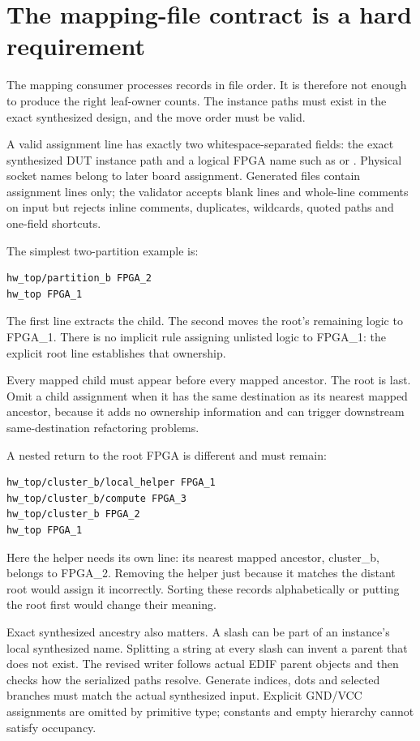 \documentclass[11pt]{article}
\newcommand{\code}[1]{\texttt{\detokenize{#1}}}
\begin{document}
\section{The mapping-file contract is a hard requirement}

The mapping consumer processes records in file order. It is therefore not enough to produce the right leaf-owner counts. The instance paths must exist in the exact synthesized design, and the move order must be valid.

A valid assignment line has exactly two whitespace-separated fields: the exact synthesized DUT instance path and a logical FPGA name such as \code{FPGA_1} or \code{FPGA_A}. Physical socket names belong to later board assignment. Generated files contain assignment lines only; the validator accepts blank lines and whole-line comments on input but rejects inline comments, duplicates, wildcards, quoted paths and one-field shortcuts.

The simplest two-partition example is:
\begin{Verbatim}[fontsize=\small]
hw_top/partition_b FPGA_2
hw_top FPGA_1
\end{Verbatim}
The first line extracts the child. The second moves the root's remaining logic to FPGA\_1. There is no implicit rule assigning unlisted logic to FPGA\_1: the explicit root line establishes that ownership.

Every mapped child must appear before every mapped ancestor. The root is last. Omit a child assignment when it has the same destination as its nearest mapped ancestor, because it adds no ownership information and can trigger downstream same-destination refactoring problems.

A nested return to the root FPGA is different and must remain:
\begin{Verbatim}[fontsize=\small]
hw_top/cluster_b/local_helper FPGA_1
hw_top/cluster_b/compute FPGA_3
hw_top/cluster_b FPGA_2
hw_top FPGA_1
\end{Verbatim}
Here the helper needs its own line: its nearest mapped ancestor, cluster\_b, belongs to FPGA\_2. Removing the helper just because it matches the distant root would assign it incorrectly. Sorting these records alphabetically or putting the root first would change their meaning.

Exact synthesized ancestry also matters. A slash can be part of an instance's local synthesized name. Splitting a string at every slash can invent a parent that does not exist. The revised writer follows actual EDIF parent objects and then checks how the serialized paths resolve. Generate indices, dots and selected branches must match the actual synthesized input. Explicit GND/VCC assignments are omitted by primitive type; constants and empty hierarchy cannot satisfy occupancy.
\end{document}
